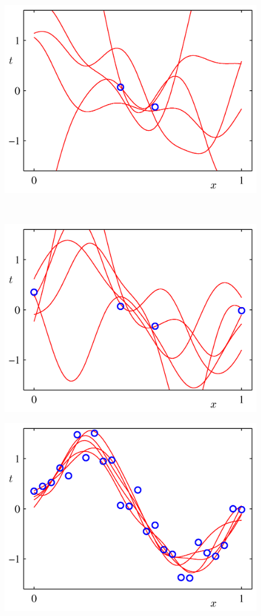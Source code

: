 \documentclass[b5paper]{book}
\numberwithin{equation}{chapter}
\begin{document}
{\begin{figure}[H]
\begin{minipage}[t]{0.5\linewidth}
		\includegraphics[scale=0.8]{Images/3-9b.png}
		\label{fig:3-9b}
		\end{minipage}\\
		\begin{minipage}[t]{0.5\linewidth}
		\centering
		\includegraphics[scale=0.8]{Images/3-9c.png}
		\label{fig:3-9c}
		\end{minipage}
		\begin{minipage}[t]{0.5\linewidth}
		\centering
		\includegraphics[scale=0.8]{Images/3-9d.png}

\end{minipage}
\end{figure}}
\end{document}
